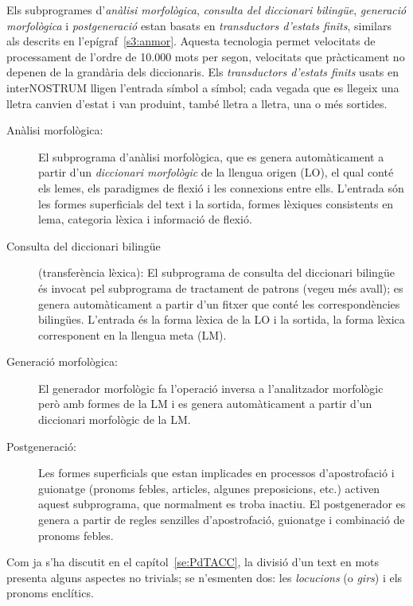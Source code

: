 Els subprogrames d'\emph{anàlisi morfològica}, \emph{consulta del
  diccionari bilingüe}, \emph{generació morfològica} i {\em
  postgeneració} estan basats en \emph{transductors d'estats finits},
similars als descrits en l'epígraf~\ref{s3:anmor}. Aquesta
tecnologia permet velocitats de processament de l'ordre de 10.000 mots
per segon, velocitats que pràcticament no depenen de la grandària dels
diccionaris. Els \emph{transductors d'estats finits} usats en
interNOSTRUM lligen l'entrada símbol a símbol; cada vegada que es
llegeix una lletra canvien d'estat i van produint, també lletra a
lletra, una o més sortides.
\begin{description}
\item[Anàlisi morfològica:] El subprograma d'anàlisi morfològica, que es
  genera automàticament a partir d'un \emph{diccionari morfològic} de
  la llengua origen (LO), el qual conté els lemes, els paradigmes de flexió
  i les connexions entre ells. L'entrada són les formes superficials
  del text i la sortida, formes lèxiques consistents en lema, categoria
  lèxica i informació de flexió. 
\item[Consulta del diccionari bilingüe] (transferència lèxica): El subprograma de consulta del
  diccionari bilingüe és invocat pel subprograma de tractament de patrons
  (vegeu més avall); es genera automàticament a partir d'un fitxer que
  conté les correspondències bilingües. L'entrada és la forma lèxica
  de la LO i la sortida, la forma lèxica corresponent en
  la llengua meta (LM).
\item[Generació morfològica:] El generador morfològic fa l'operació
  inversa a l'analitzador morfològic però amb formes de la LM i es
  genera automàticament a partir d'un diccionari morfològic de la LM.
\item[Postgeneració:] Les formes superficials que estan implicades en
  processos d'apostrofació i guionatge (pronoms febles, articles,
  algunes preposicions, etc.) activen aquest subprograma, que
  normalment es troba inactiu. El postgenerador es genera a partir de
  regles senzilles d'apostrofació, guionatge i combinació de pronoms febles.
\end{description}
Com ja s'ha discutit en el capítol~\ref{se:PdTACC}, la divisió d'un
text en mots presenta alguns aspectes no trivials; se n'esmenten dos:
les \emph{locucions} (o \emph{girs}) i els pronoms enclítics.


